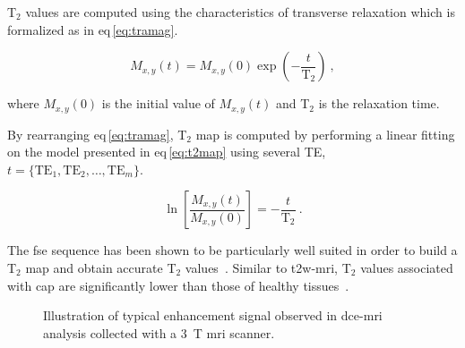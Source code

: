 T$_2$ values are computed using the characteristics of transverse relaxation which is formalized as in \acs{eq}\,\eqref{eq:tramag}.

\begin{equation}
	M_{x,y}(t) = M_{x,y}(0) \exp \left( - \frac{t}{\text{T}_2} \right) \ ,
	\label{eq:tramag}
\end{equation}

\noindent where $M_{x,y}(0)$ is the initial value of $M_{x,y}(t)$ and T$_2$ is the relaxation time.

By rearranging \acs{eq}\,\eqref{eq:tramag}, T$_2$ map is computed by performing a linear fitting on the model presented in \acs{eq}\,\eqref{eq:t2map} using several TE, $t=\{ \text{TE}_1,\text{TE}_2, \dotsc ,\text{TE}_m \}$.

\begin{equation}
	\ln \left[ \frac{M_{x,y}(t)}{M_{x,y}(0)} \right] = - \frac{t}{\text{T}_2} \ .
	\label{eq:t2map}
\end{equation}

The \Ac{fse} sequence has been shown to be particularly well suited in order to build a T$_2$ map and obtain accurate T$_2$ values~\cite{Liney1996a}.
Similar to \ac{t2w}-\ac{mri}, T$_2$ values associated with \ac{cap} are significantly lower than those of healthy tissues~\cite{Liney1996,Gibbs2001}.

\begin{figure}
\centering
	\hspace*{\fill}
	 \hfill
	\hspace*{\fill}
	\caption[Enhancement of \acs*{dce}-\acs*{mri} signal.]{Illustration of typical enhancement signal observed in \acs*{dce}-\acs*{mri} analysis collected with a \SI{3}{\tesla} \acs*{mri} scanner.}
	\label{fig:dceana}
\end{figure}

